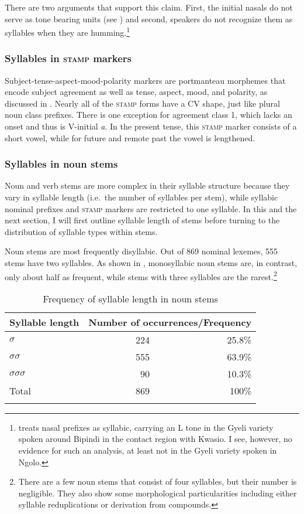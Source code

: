\noindent There are two arguments that support this claim. First, the initial nasals do not serve as tone bearing units (see ) and second, speakers do not recognize them as syllables when they are humming.\footnote{\citet[109]{renaud76} treats nasal prefixes as syllabic, carrying an L tone in the Gyeli variety spoken around Bipindi in the contact region with Kwasio. I see, however, no evidence for such an analysis, at least not in the Gyeli variety spoken in Ngolo.}


\subsubsection{Syllables in \textsc{stamp} markers}
\label{sec:SyllSCOP}

Subject-tense-aspect-mood-polarity markers are portmanteau morphemes that encode subject agreement as well as tense, aspect, mood, and polarity, as discussed in . Nearly all of the \textsc{stamp} forms have a CV shape, just like plural noun class prefixes. There is one exception for agreement class 1,  which lacks an onset and thus is V-initial {\itshape a}. In the present tense, this \textsc{stamp} marker consists of a short vowel, while for future and remote past the vowel is lengthened.

\subsubsection{Syllables in noun stems}
\label{sec:SyllN}

Noun and verb stems are more complex in their syllable structure because they vary in syllable length (i.e.\ the number of syllables per stem), while syllabic nominal prefixes and \textsc{stamp} markers are restricted to one syllable. In this and the next section, I will first outline syllable length of stems before turning to the distribution of syllable types within stems.

Noun stems are most frequently disyllabic. Out of 869 nominal lexemes, 555 stems have two syllables. As shown in , monosyllabic noun stems are, in contrast, only about half as frequent, while stems with three syllables are the rarest.\footnote{There are a few noun stems that consist of four syllables, but their number is negligible. They also show some morphological particularities including either syllable reduplications or derivation from compounds.}


\begin{table}
\begin{tabular}{lrr}
\lsptoprule
Syllable length & \multicolumn{2}{l}{Number of occurrences/Frequency} \\
\midrule
$\sigma$    & 224  & 25.8\% \\
$\sigma$$\sigma$  & 555 & 63.9\% \\
$\sigma$$\sigma$$\sigma$  & 90 & 10.3\% \\
 \midrule
Total & 869 & 100\%\\
\lspbottomrule
\end{tabular}
\caption{Frequency of syllable length in noun stems}
\label{Tab:NstemSyll}
\end{table}        

